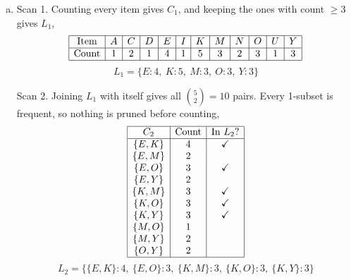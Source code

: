 \documentclass[12pt,letterpaper, onecolumn]{exam}
\begin{document}
\begin{questions}
\begin{solution}
        \begin{enumerate}[a.)]
            \item

            Scan 1. Counting every item gives $C_1$, and keeping the ones with count $\geq 3$ gives $L_1$,
            \begin{equation*}
                \begin{array}{|c|c|c|c|c|c|c|c|c|c|c|c|}
                    \hline \text{Item} & A & C & D & E & I & K & M & N & O & U & Y \\ \hline
                    \text{Count} & 1 & 2 & 1 & 4 & 1 & 5 & 3 & 2 & 3 & 1 & 3 \\ \hline
                \end{array}
            \end{equation*}
            \begin{equation*}
                L_1 = \{E:4,\ K:5,\ M:3,\ O:3,\ Y:3\}
            \end{equation*}

            Scan 2. Joining $L_1$ with itself gives all $\binom{5}{2}=10$ pairs. Every 1-subset is frequent, so nothing is pruned before counting,
            \begin{equation*}
                \begin{array}{|c|c|c|}
                    \hline C_2 & \text{Count} & \text{In } L_2? \\ \hline
                    \{E,K\} & 4 & \checkmark \\
                    \{E,M\} & 2 & \\
                    \{E,O\} & 3 & \checkmark \\
                    \{E,Y\} & 2 & \\
                    \{K,M\} & 3 & \checkmark \\
                    \{K,O\} & 3 & \checkmark \\
                    \{K,Y\} & 3 & \checkmark \\
                    \{M,O\} & 1 & \\
                    \{M,Y\} & 2 & \\
                    \{O,Y\} & 2 & \\ \hline
                \end{array}
            \end{equation*}
            \begin{equation*}
                L_2 = \{\{E,K\}:4,\ \{E,O\}:3,\ \{K,M\}:3,\ \{K,O\}:3,\ \{K,Y\}:3\}
            \end{equation*}


\end{enumerate}
\end{solution}
\end{questions}
\end{document}
